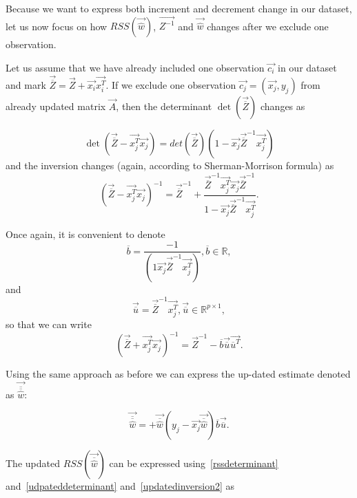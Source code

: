 Because we want to express both increment and decrement change in our dataset, let us now focus on how $RSS(\vec{\hat{w}})$, $\vec{Z^{-1}}$ and $\vec{\hat{w}}$  changes after we exclude one observation. 

Let us assume that we have already included one observation $\vec{c_i}$ in our dataset and mark $\vec{\overline{Z}} = \vec{Z} + \vec{x_i} \vec{x_i^T} $. If we exclude one observation $\vec{c_j} = (\vec{x_j}, y_j)$ from already updated matrix $\vec{A}$, then the determinant $\det(\vec{\overline{Z}})$  changes as

\begin{equation} 
    \det(\vec{\overline{Z}} - \vec{x_j^T}\vec{x_j}) = det(\vec{\overline{Z}})(1 - \vec{x_j}\vec{\overline{Z}}^{-1}\vec{x_j^T})
\end{equation}
and the inversion changes (again, according to Sherman-Morrison formula) as 
\begin{equation}  
    (\vec{\overline{Z}} - \vec{x_j^T}\vec{x_j})^{-1} = \vec{\overline{Z}}^{-1} + \dfrac{\vec{\overline{Z}}^{-1}\vec{x_j^T}\vec{x_j}\vec{\overline{Z}}^{-1}}{1 - \vec{x_j}\vec{\overline{Z}}^{-1}\vec{x_j^T}}.
\end{equation}

Once again, it is convenient to denote
\begin{equation}
    \overline{b} = \dfrac{-1}{(1  \vec{x_j}\vec{\overline{Z}}^{-1}\vec{x_j^T})},  \overline{b} \in \mathbb{R},
\end{equation}
and 
\begin{equation}
    \vec{\overline{u}} = \vec{\overline{Z}}^{-1}\vec{x_j^T},      \vec{\overline{u}} \in \mathbb{R}^{p \times 1},
\end{equation}
so that we can write
\begin{equation} \label{updatedinversion2}
    (\vec{\overline{Z}} + \vec{x_j^T}\vec{x_j})^{-1} = \vec{Z}^{-1} - \overline{b}\vec{\overline{u}}\vec{\overline{u}^T}.
\end{equation}

Using the same approach as before we can express the up-dated estimate denoted as $\vec{\overline{\overline{\hat{w}}}}$:

\begin{equation} \label{thetaminus}
    \vec{\overline{\overline{\hat{w}}}} =  +\vec{\overline{\hat{w}}} (y_j - \vec{x_j}\vec{\overline{\hat{w}}}) \overline{b} \vec{\overline{u}}.
\end{equation}

The updated $RSS(\vec{\overline{\hat{w}}})$ can be expressed using~\eqref{rssdeterminant} and~\eqref{udpateddeterminant} and~\eqref{updatedinversion2} as 

